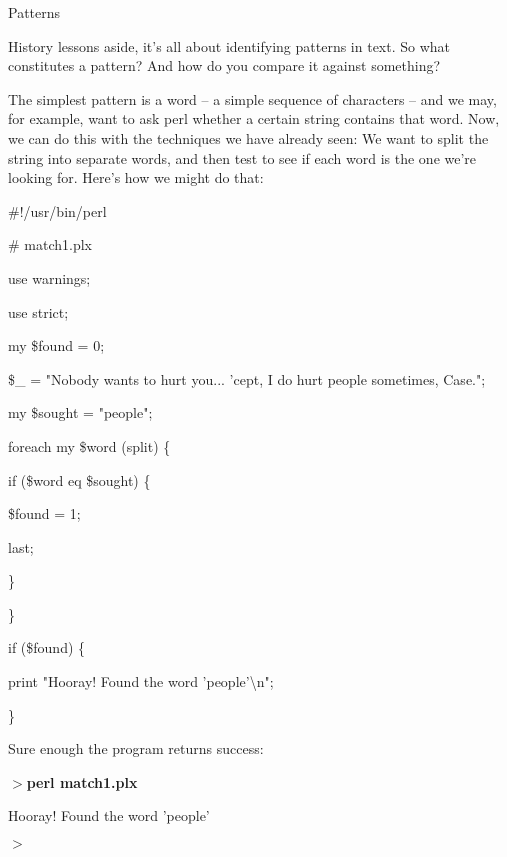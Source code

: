 \documentclass[a4paper,11pt]{book}
\begin{document}
\noindent 

\noindent Patterns

\noindent History lessons aside, it's all about identifying patterns in text. So what constitutes a pattern? And how do you compare it against something?

\noindent 

\noindent The simplest pattern is a word -- a simple sequence of characters -- and we may, for example, want to ask perl whether a certain string contains that word. Now, we can do this with the techniques we have already seen: We want to split the string into separate words, and then test to see if each word is the one we're looking for. Here's how we might do that:

\noindent 

\noindent \#!/usr/bin/perl

\noindent \# match1.plx

\noindent use warnings;

\noindent use strict;

\noindent 

\noindent my \$found = 0;

\noindent \$\_  = "Nobody wants to hurt you... 'cept, I do hurt people sometimes, Case.";

\noindent 

\noindent my \$sought = "people";

\noindent 

\noindent foreach my \$word (split) \{

\noindent if (\$word eq \$sought) \{

\noindent \$found = 1;

\noindent last;

\noindent \}

\noindent \}

\noindent 

\noindent if (\$found) \{

\noindent print "Hooray! Found the word 'people'\textbackslash n";

\noindent \}

\noindent 

\noindent Sure enough the program returns success:

\noindent 

\noindent $>$\textbf{perl match1.plx}

\noindent Hooray! Found the word 'people'

\noindent $>$

\noindent 
\end{document}
